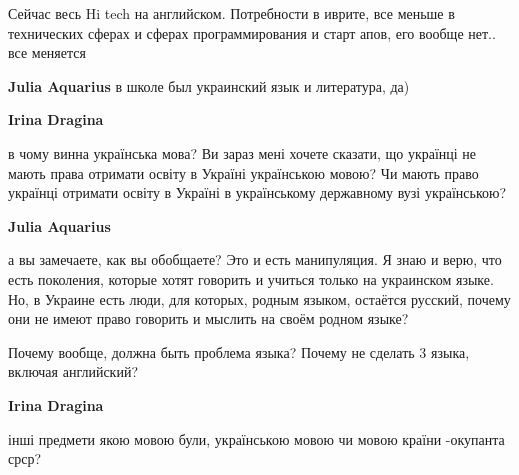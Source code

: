\begin{itemize}
\begin{itemize}
Сейчас весь Hi tech на английском. Потребности в иврите, все меньше в
технических сферах и сферах программирования и старт апов, его вообще нет.. все
меняется


 
\textbf{Julia Aquarius} в школе был украинский язык и литература, да)

 
\textbf{Irina Dragina} 

в чому винна українська мова? Ви зараз мені хочете сказати, що українці не
мають права отримати освіту в Україні українською мовою? Чи мають право
українці отримати освіту в Україні в українському державному вузі українською?

 
\textbf{Julia Aquarius} 

а вы замечаете, как вы обобщаете? Это и есть манипуляция. Я знаю и верю, что
есть поколения, которые хотят говорить и учиться только на украинском языке.
Но, в Украине есть люди, для которых, родным языком, остаётся русский, почему
они не имеют право говорить и мыслить на своём родном языке?

Почему вообще, должна быть проблема языка? Почему не сделать 3 языка, включая
английский?


 
\textbf{Irina Dragina} 

інші предмети якою мовою були, українською мовою чи мовою країни -окупанта
срср?


 

\end{itemize}
\end{itemize}
